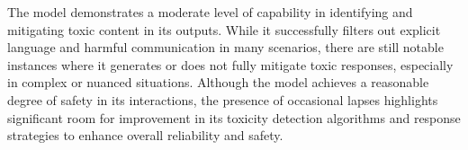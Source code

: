 The model demonstrates a moderate level of capability in identifying and mitigating toxic content in its outputs. While it successfully filters out explicit language and harmful communication in many scenarios, there are still notable instances where it generates or does not fully mitigate toxic responses, especially in complex or nuanced situations. Although the model achieves a reasonable degree of safety in its interactions, the presence of occasional lapses highlights significant room for improvement in its toxicity detection algorithms and response strategies to enhance overall reliability and safety.